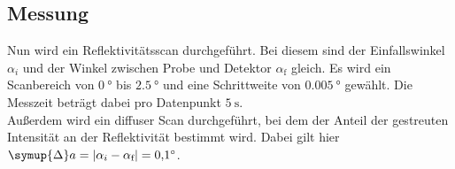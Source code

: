 \subsection{Messung}

Nun wird ein Reflektivitätsscan durchgeführt. Bei diesem sind der Einfallswinkel $\alpha_i$ und der Winkel zwischen Probe 
und Detektor $\alpha_\text{f}$ gleich. Es wird ein Scanbereich von $\SI{0}{\degree}$ bis $\SI{2.5}{\degree}$ und eine Schrittweite 
von $\SI{0.005}{\degree}$ gewählt. Die Messzeit beträgt dabei pro Datenpunkt $\SI{5}{\second}$. \\
Außerdem wird ein diffuser Scan durchgeführt, bei dem der Anteil der gestreuten Intensität an der Reflektivität bestimmt wird. Dabei
gilt hier $\symup{\Delta}a = \vert \alpha_i - \alpha_\text{f}\vert = \SI{0.1}{\degree}$.